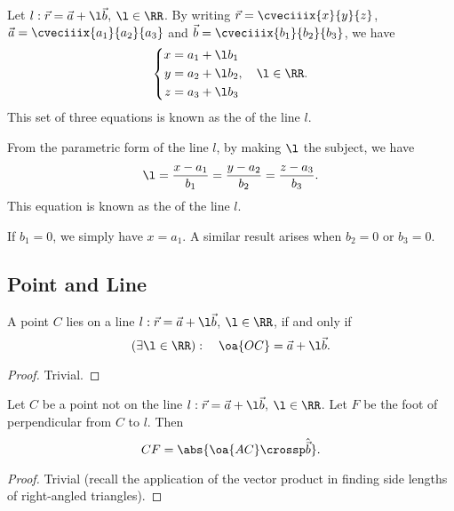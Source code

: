 \begin{definition}
    Let $l : \vec r = \vec a + \l \vec b$, $\l \in \RR$. By writing $\vec r = \cveciiix{x}{y}{z}$, $\vec a = \cveciiix{a_1}{a_2}{a_3}$ and $\vec b = \cveciiix{b_1}{b_2}{b_3}$, we have \[\left\{ \begin{aligned}
        x = a_1 + \l b_1\\
        y = a_2 + \l b_2\\
        z = a_3 + \l b_3
    \end{aligned}, \quad \l \in \RR. \right.\] This set of three equations is known as the  of the line $l$.
\end{definition}

\begin{definition}
    From the parametric form of the line $l$, by making $\l$ the subject, we have \[\l = \frac{x-a_1}{b_1} = \frac{y - a_2}{b_2} = \frac{z - a_3}{b_3}.\] This equation is known as the  of the line $l$.
\end{definition}
\begin{remark}
    If $b_1 = 0$, we simply have $x = a_1$. A similar result arises when $b_2 = 0$ or $b_3 = 0$.
\end{remark}

\subsection{Point and Line}

\begin{proposition}
    A point $C$ lies on a line $l : \vec r = \vec a + \l \vec b$, $\l \in \RR$, if and only if \[(\exists \l \in \RR): \quad \oa{OC} = \vec a + \l \vec b.\]
\end{proposition}
\begin{proof}
    Trivial.
\end{proof}

\begin{proposition}
    Let $C$ be a point not on the line $l : \vec r = \vec a + \l \vec b$, $\l \in \RR$. Let $F$ be the foot of perpendicular from $C$ to $l$. Then \[CF = \abs{\oa{AC} \crossp \hat{\vec b}}.\]
\end{proposition}
\begin{proof}
    Trivial (recall the application of the vector product in finding side lengths of right-angled triangles).
\end{proof}

